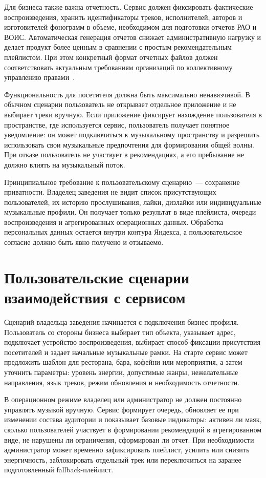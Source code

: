 Для бизнеса также важна отчетность. Сервис должен фиксировать фактические воспроизведения, хранить идентификаторы треков, исполнителей, авторов и изготовителей фонограмм в объеме, необходимом для подготовки отчетов РАО и ВОИС. Автоматическая генерация отчетов снижает административную нагрузку и делает продукт более ценным в сравнении с простым рекомендательным плейлистом. При этом конкретный формат отчетных файлов должен соответствовать актуальным требованиям организаций по коллективному управлению правами~\cite{rao_report_forms,vois_report_form}.

Функциональность для посетителя должна быть максимально ненавязчивой. В обычном сценарии пользователь не открывает отдельное приложение и не выбирает треки вручную. Если приложение фиксирует нахождение пользователя в пространстве, где используется сервис, пользователь получает понятное уведомление: он может подключиться к музыкальному пространству и разрешить использовать свои музыкальные предпочтения для формирования общей волны. При отказе пользователь не участвует в рекомендациях, а его пребывание не должно влиять на музыкальный поток.

Принципиальное требование к пользовательскому сценарию~--- сохранение приватности. Владелец заведения не видит список присутствующих пользователей, их историю прослушивания, лайки, дизлайки или индивидуальные музыкальные профили. Он получает только результат в виде плейлиста, очереди воспроизведения и агрегированных операционных данных. Обработка персональных данных остается внутри контура Яндекса, а пользовательское согласие должно быть явно получено и отзываемо.

\section{Пользовательские сценарии взаимодействия с сервисом}
\label{sec:service:journeys}

Сценарий владельца заведения начинается с подключения бизнес-профиля. Пользователь со стороны бизнеса выбирает тип объекта, указывает адрес, подключает устройство воспроизведения, выбирает способ фиксации присутствия посетителей и задает начальные музыкальные рамки. На старте сервис может предложить шаблон для ресторана, бара, кофейни или мероприятия, а затем уточнить параметры: уровень энергии, допустимые жанры, нежелательные направления, язык треков, режим обновления и необходимость отчетности.

В операционном режиме владелец или администратор не должен постоянно управлять музыкой вручную. Сервис формирует очередь, обновляет ее при изменении состава аудитории и показывает базовые индикаторы: активен ли маяк, сколько пользователей участвует в формировании рекомендаций в агрегированном виде, не нарушены ли ограничения, сформирован ли отчет. При необходимости администратор может временно зафиксировать плейлист, усилить или снизить энергичность, заблокировать отдельный трек или переключиться на заранее подготовленный fallback-плейлист.

